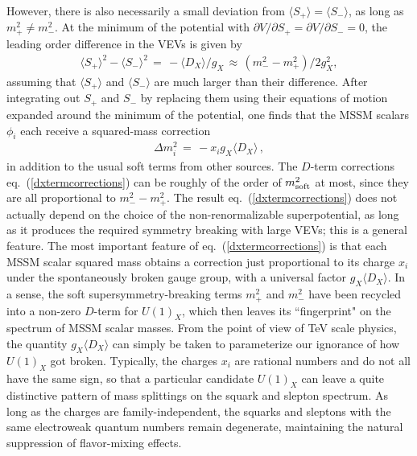 \documentclass[12pt]{article}
\def\beq{\begin{eqnarray}}
\def\eeq{\end{eqnarray}}
\def\Splus{S_+}
\def\Sminus{S_-}
\begin{document}
However, there is also necessarily a small deviation from $\langle 
\Splus\rangle = \langle \Sminus \rangle$, as long as $m_+^2 \not= 
m_-^2$. At the minimum of the potential with $\partial V/\partial 
\Splus = \partial V/\partial \Sminus = 0$, the leading order difference in 
the VEVs is given by
\beq
 \langle \Splus \rangle^2 - \langle \Sminus \rangle^2 
\,=\, -\langle D_X \rangle/g_X 
\,\approx\,  (m_-^2 - m_+^2)/2 g_X^2,
\eeq
assuming that $\langle \Splus \rangle$ and $\langle \Sminus \rangle$ are 
much larger than their difference. After integrating out $\Splus$ and 
$\Sminus$ by replacing them using their equations of motion expanded 
around the minimum of the potential, one finds that the MSSM scalars 
$\phi_i$ each receive a squared-mass correction
\beq
\Delta m_i^2 \,=\,  -x_i g_X \langle D_X \rangle\, ,
\label{dxtermcorrections}
\eeq
in addition to the usual soft terms from other sources. The $D$-term
corrections eq.~(\ref{dxtermcorrections}) can be roughly of the order of
$m_{\rm soft}^2$ at most, since they are all proportional to $m_-^2-
m_+^2$. The result eq.~(\ref{dxtermcorrections}) does not
actually depend on the choice of the non-renormalizable superpotential, as
long as it produces the required symmetry breaking with large VEVs; this
is a general feature. The most important feature of
eq.~(\ref{dxtermcorrections}) is that each MSSM scalar squared mass
obtains a correction just proportional to its charge $x_i$ under the
spontaneously broken gauge group, with a universal factor $g_X \langle D_X
\rangle$. In a sense, the soft supersymmetry-breaking terms $m_+^2$ and
$m_-^2$ have been recycled into a non-zero $D$-term for $U(1)_X$,
which then leaves its ``fingerprint" on the spectrum of MSSM scalar
masses. From the point of view of TeV scale physics, the quantity $g_X
\langle D_X \rangle$ can simply be taken to parameterize our ignorance of
how $U(1)_X$ got broken. Typically, the charges $x_i$ are rational numbers
and do not all have the same sign, so that a particular candidate $U(1)_X$
can leave a quite distinctive pattern of mass splittings on the squark and
slepton spectrum. As long as the charges are family-independent, the
squarks and sleptons with the same electroweak quantum numbers remain
degenerate, maintaining the natural suppression of flavor-mixing effects. 
\end{document}
